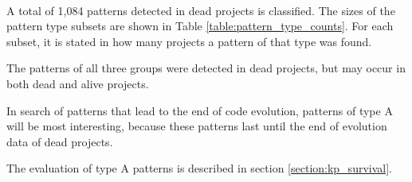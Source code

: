\paragraph{}
A total of 1,084 patterns detected in dead projects is classified. The sizes of
the pattern type subsets are shown in Table \ref{table:pattern_type_counts}.
For each subset, it is stated in how many projects a pattern of that type was
found.



\noindent
The patterns of all three groups were detected in dead projects, but may occur
in both dead and alive projects.

In search of patterns that lead to the end of code evolution, patterns of type
A will be most interesting, because these patterns last until the end of
evolution data of dead projects.

The evaluation of type A patterns is described in section
\ref{section:kp_survival}.

\begin{comment}
- Factual results
- Tables and figures for clarification

This chapter presents and clarifies the results obtained during the research.
The focus should be on the factual results, not the interpretation or
discussion. Tables and graphics should be used to increase the clarity of the
results where applicable.
Have a look at the the results chapter in this example thesis on Paul’s
homepage\footnote{http://homepages.cwi.nl/~paulk/thesesMasterSoftwareEngineering/2006/ArnoldLankamp.pdf}.
\end{comment}
